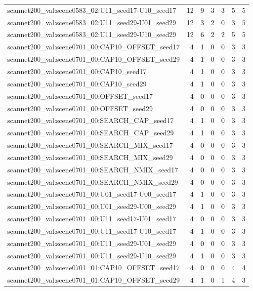 \begin{table}[t]
\begin{tabular}{lrrrrrr}
scannet200\_val:scene0583\_02:U11\_seed17-U10\_seed17 & 12 & 9 & 3 & 3 & 5 & 5 \\
scannet200\_val:scene0583\_02:U11\_seed29-U01\_seed29 & 12 & 3 & 2 & 0 & 3 & 5 \\
scannet200\_val:scene0583\_02:U11\_seed29-U10\_seed29 & 12 & 6 & 2 & 2 & 5 & 5 \\
scannet200\_val:scene0701\_00:CAP10\_OFFSET\_seed17 & 4 & 1 & 0 & 0 & 3 & 3 \\
scannet200\_val:scene0701\_00:CAP10\_OFFSET\_seed29 & 4 & 1 & 0 & 0 & 3 & 3 \\
scannet200\_val:scene0701\_00:CAP10\_seed17 & 4 & 1 & 0 & 0 & 3 & 3 \\
scannet200\_val:scene0701\_00:CAP10\_seed29 & 4 & 1 & 0 & 0 & 3 & 3 \\
scannet200\_val:scene0701\_00:OFFSET\_seed17 & 4 & 0 & 0 & 0 & 3 & 3 \\
scannet200\_val:scene0701\_00:OFFSET\_seed29 & 4 & 0 & 0 & 0 & 3 & 3 \\
scannet200\_val:scene0701\_00:SEARCH\_CAP\_seed17 & 4 & 1 & 0 & 0 & 3 & 3 \\
scannet200\_val:scene0701\_00:SEARCH\_CAP\_seed29 & 4 & 1 & 0 & 0 & 3 & 3 \\
scannet200\_val:scene0701\_00:SEARCH\_MIX\_seed17 & 4 & 0 & 0 & 0 & 3 & 3 \\
scannet200\_val:scene0701\_00:SEARCH\_MIX\_seed29 & 4 & 0 & 0 & 0 & 3 & 3 \\
scannet200\_val:scene0701\_00:SEARCH\_NMIX\_seed17 & 4 & 0 & 0 & 0 & 3 & 3 \\
scannet200\_val:scene0701\_00:SEARCH\_NMIX\_seed29 & 4 & 0 & 0 & 0 & 3 & 3 \\
scannet200\_val:scene0701\_00:U01\_seed17-U00\_seed17 & 4 & 1 & 0 & 0 & 3 & 3 \\
scannet200\_val:scene0701\_00:U01\_seed29-U00\_seed29 & 4 & 1 & 0 & 0 & 3 & 3 \\
scannet200\_val:scene0701\_00:U11\_seed17-U01\_seed17 & 4 & 0 & 0 & 0 & 3 & 3 \\
scannet200\_val:scene0701\_00:U11\_seed17-U10\_seed17 & 4 & 1 & 0 & 0 & 3 & 3 \\
scannet200\_val:scene0701\_00:U11\_seed29-U01\_seed29 & 4 & 0 & 0 & 0 & 3 & 3 \\
scannet200\_val:scene0701\_00:U11\_seed29-U10\_seed29 & 4 & 1 & 0 & 0 & 3 & 3 \\
scannet200\_val:scene0701\_01:CAP10\_OFFSET\_seed17 & 4 & 0 & 0 & 0 & 4 & 4 \\
scannet200\_val:scene0701\_01:CAP10\_OFFSET\_seed29 & 4 & 1 & 0 & 1 & 4 & 3 \\

\end{tabular}
\end{table}
